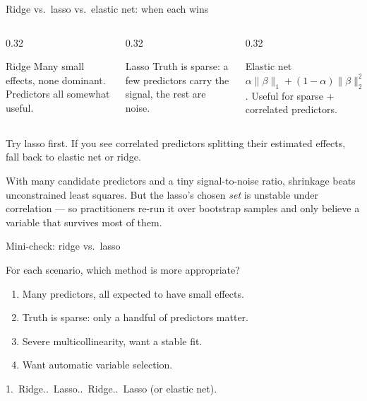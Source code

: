 \documentclass[aspectratio=169,11pt]{beamer}
\begin{document}
\begin{frame}{Ridge vs.\ lasso vs.\ elastic net: when each wins}
  \begin{columns}[T]
    \begin{column}{0.32\textwidth}
      \begin{block}{Ridge}
        Many small effects, none dominant. Predictors all somewhat
        useful.
      \end{block}
    \end{column}
    \begin{column}{0.32\textwidth}
      \begin{block}{Lasso}
        Truth is sparse: a few predictors carry the signal, the rest
        are noise.
      \end{block}
    \end{column}
    \begin{column}{0.32\textwidth}
      \begin{block}{Elastic net}
        $\alpha\|\beta\|_1 + (1-\alpha)\|\beta\|_2^2$. Useful for
        sparse + correlated predictors.
      \end{block}
    \end{column}
  \end{columns}
  \begin{takeaway}
    Try lasso first. If you see correlated predictors splitting their
    estimated effects, fall back to elastic net or ridge.
  \end{takeaway}
  \begin{industry}
    With many candidate predictors and a tiny signal-to-noise ratio,
    shrinkage beats unconstrained least squares. But the lasso's chosen
    \emph{set} is unstable under correlation --- so practitioners re-run
    it over bootstrap samples and only believe a variable that survives
    most of them.
  \end{industry}
\end{frame}


\begin{frame}{Mini-check: ridge vs.\ lasso}
  \begin{readme}
    For each scenario, which method is more appropriate?
    \begin{enumerate}
      \item Many predictors, all expected to have small effects.
      \item Truth is sparse: only a handful of predictors matter.
      \item Severe multicollinearity, want a stable fit.
      \item Want automatic variable selection.
    \end{enumerate}
  \end{readme}
  \begin{takeaway}[Answers]
    1.\ Ridge..\ Lasso..\ Ridge..\ Lasso (or elastic
    net).
  \end{takeaway}
\end{frame}
\end{document}
